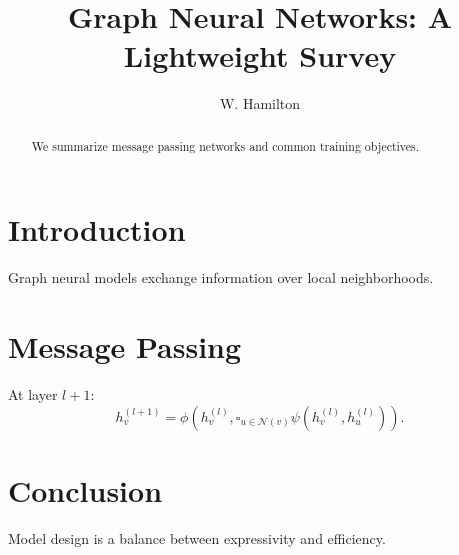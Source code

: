 \documentclass[sigconf]{acmart}
\title{Graph Neural Networks: A Lightweight Survey}
\author{W. Hamilton}
\affiliation{\institution{Example University}\country{USA}}
\begin{document}
\begin{abstract}
We summarize message passing networks and common training objectives.
\end{abstract}
\maketitle
\section{Introduction}
Graph neural models exchange information over local neighborhoods.
\section{Message Passing}
At layer $l+1$:
\begin{equation}
h_v^{(l+1)}=\phi\left(h_v^{(l)},\square_{u\in\mathcal{N}(v)}\psi(h_v^{(l)},h_u^{(l)})\right).
\end{equation}
\section{Conclusion}
Model design is a balance between expressivity and efficiency.


\end{document}
